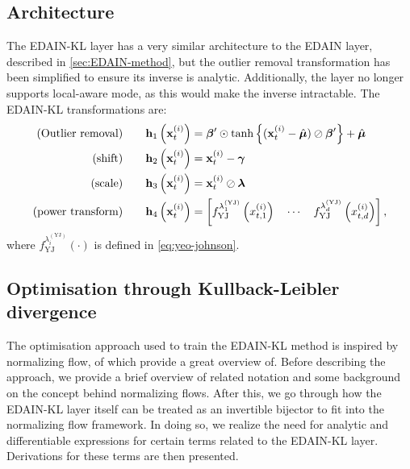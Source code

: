 \documentclass{statsmsc}
\begin{document}
{\subsection{Architecture}%
\label{sub:Architecture}

The \ac{EDAIN-KL} layer has a very similar architecture to the \ac{EDAIN} layer, described in
\cref{sec:EDAIN-method}, but the outlier removal transformation has been simplified to ensure its
inverse is analytic. Additionally, the layer no longer supports local-aware mode, as this
would make the inverse intractable. The \ac{EDAIN-KL} transformations are:
\begin{align}
    \textrm{(Outlier removal)} \qquad& \mathbf{h}_1\left(\mathbf{x}^{(i)}_t\right)=\bm\beta' \odot \tanh\left\{(\mathbf{x}^{(i)}_t - \hat{\bm\mu}) \oslash \bm\beta' \right\}+\hat{\bm\mu} \label{eq:kl1}\\
    \textrm{(shift)} \qquad& \mathbf{h}_2\left(\mathbf{x}^{(i)}_t\right)=\mathbf{x}^{(i)}_t- \bm\gamma \label{eq:kl2}\\
    \textrm{(scale)} \qquad& \mathbf{h}_3\left(\mathbf{x}^{(i)}_t\right)=\mathbf{x}^{(i)}_t \oslash \bm\lambda  \label{eq:kl3}\\
    \textrm{(power transform)} \qquad& \mathbf{h}_4\left(\mathbf{x}^{(i)}_t\right)=\left[
        f^{\lambda_1^ {(\textrm{YJ})} }_{\textrm{YJ}}\left(x^{(i)}_{t,1}\right)
        \quad \cdots
        \quad f^{\lambda_d^ {(\textrm{YJ})}}_{\textrm{YJ}}\left(x^{(i)}_{t,d}\right)
    \right], \label{eq:kl4}
\end{align}
where $f^{\lambda_i^ {(\textrm{YJ})}}_{\textrm{YJ}}(\cdot)$ is defined in \cref{eq:yeo-johnson}.

\subsection{Optimisation through Kullback-Leibler divergence}%
\label{sub:opt_with_kl}

The  optimisation approach used to train the \ac{EDAIN-KL} method is inspired by normalizing flow,
of which \cite{normalizing_flows} provide a great overview of.
Before describing the approach, we provide a brief overview of related notation and some
background on the concept behind normalizing flows. After this, we go through how the
\ac{EDAIN-KL} layer itself can be treated as an invertible bijector to fit into the
normalizing flow framework. In doing so, we realize the need for analytic and differentiable
expressions for certain terms related to the \ac{EDAIN-KL} layer. Derivations for these terms are
then presented.

}
\end{document}
